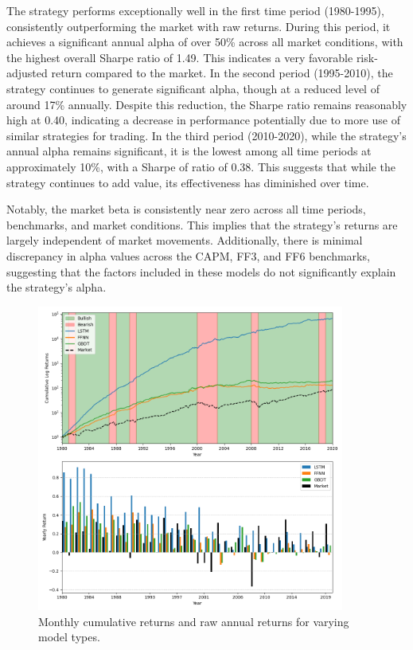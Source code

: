 \documentclass{article}
\begin{document}
The strategy performs exceptionally well in the first time period (1980-1995), consistently outperforming the market with raw returns. During this period, it achieves a significant annual alpha of over 50\% across all market conditions, with the highest overall Sharpe ratio of 1.49. This indicates a very favorable risk-adjusted return compared to the market. In the second period (1995-2010), the strategy continues to generate significant alpha, though at a reduced level of around 17\% annually. Despite this reduction, the Sharpe ratio remains reasonably high at 0.40, indicating a decrease in performance potentially due to more use of similar strategies for trading. In the third period (2010-2020), while the strategy's annual alpha remains significant, it is the lowest among all time periods at approximately 10\%, with a Sharpe of ratio of 0.38. This suggests that while the strategy continues to add value, its effectiveness has diminished over time.

Notably, the market beta is consistently near zero across all time periods, benchmarks, and market conditions. This implies that the strategy's returns are largely independent of market movements. Additionally, there is minimal discrepancy in alpha values across the CAPM, FF3, and FF6 benchmarks, suggesting that the factors included in these models do not significantly explain the strategy's alpha.


\begin{figure}[H]
    \centering
    \includegraphics[width=0.9\textwidth]{2020_plot1_model_comparison.png}
    \caption{Monthly cumulative returns and raw annual returns for varying model types.}
    \label{fig:model_comp}
\end{figure}
\end{document}
